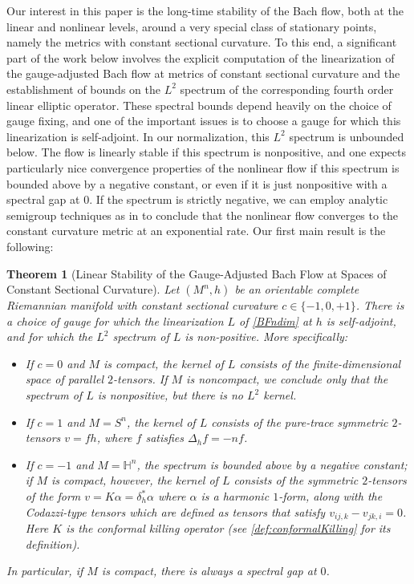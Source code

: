 \documentclass[10pt,reqno]{amsart}
\newtheorem{theorem}{Theorem}[section]
\begin{document}
Our interest in this paper is the long-time stability of the Bach flow, both at the linear and nonlinear levels, around a very special class of stationary points, namely the metrics 
with constant sectional curvature.  To this end, a significant part of the work below involves the explicit computation of the linearization of the gauge-adjusted Bach flow 
at metrics of constant sectional curvature and the establishment of bounds on the $L^2$ spectrum of the corresponding fourth order linear elliptic operator.   These spectral
bounds depend heavily on the choice of gauge fixing, and one of the important issues is to choose a gauge for which this linearization is self-adjoint. 
In our normalization, this $L^2$ spectrum is unbounded below. The flow is linearly stable if this spectrum is nonpositive, and one expects particularly nice convergence properties 
of the nonlinear flow if this spectrum is bounded above by a negative constant, or even if it is just nonpositive with a spectral gap at $0$.  If the spectrum is strictly
negative, we can employ analytic semigroup techniques as in \cite{BGIM} to conclude that the nonlinear flow converges to the constant curvature metric at an exponential
rate. Our first main result is the following: 
\begin{theorem}[Linear Stability of the Gauge-Adjusted Bach Flow at Spaces of Constant Sectional Curvature] \label{thm:main-1}
Let $(M^n, h)$ be an orientable complete Riemannian manifold with constant sectional curvature $c \in \{-1, 0, +1\}$.  There is a choice of gauge for which the 
linearization $L$ of \eqref{BFndim} at $h$ is self-adjoint, and for which the $L^2$ spectrum of $L$ is non-positive. More specifically: 
\begin{itemize}
\item If $c=0$ and $M$ is compact, the kernel of $L$ consists of the finite-dimensional space of parallel $2$-tensors. If $M$ is 
noncompact, we conclude only that the spectrum of $L$ is nonpositive, but there is no $L^2$ kernel. 
\item If $c = 1$ and $M = S^n$, the kernel of $L$ consists of the pure-trace symmetric $2$-tensors $v=f h$, where $f$ satisfies $\Delta_h f = -n f$. 
\item  If $c = -1$ and $M = \mathbb H^n$, the spectrum is bounded above by a negative constant; if $M$ is compact, however,
the kernel of $L$ consists of the symmetric $2$-tensors of the form $v = K\alpha = \delta^*_h \alpha$ where $\alpha$ is a harmonic $1$-form, along with the Codazzi-type 
tensors which are defined as tensors that satisfy $v_{ij,k} - v_{jk,i} = 0$. Here $K$ is the conformal killing operator (see \eqref{def:conformalKilling} for its definition).
\end{itemize}
In particular, if $M$ is compact, there is always a spectral gap at $0$. 
\end{theorem}
\end{document}
